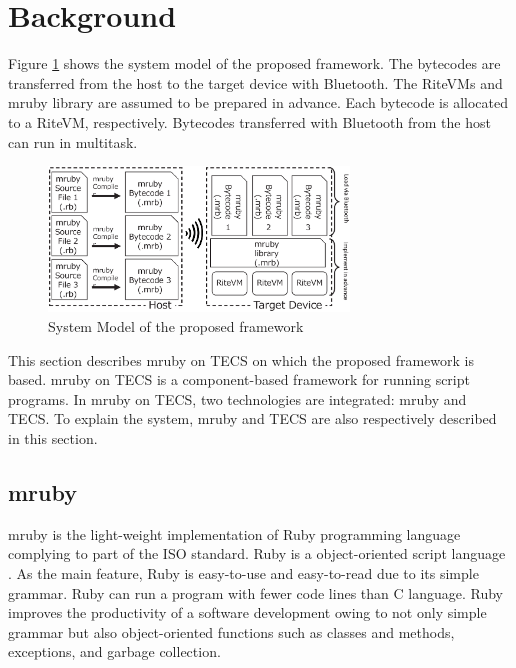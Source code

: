 \documentclass{sig-alternate-05-2015}
\begin{document}
\section{Background}
\label{sec:Background}
Figure \ref{fig:proposed} shows the system model of the proposed framework.
The bytecodes are transferred from the host to the target device with Bluetooth.
The RiteVMs and mruby library are assumed to be prepared in advance.
Each bytecode is allocated to a RiteVM, respectively.
Bytecodes transferred with Bluetooth from the host can run in multitask.

\begin{figure}[t]
    \centering
    \includegraphics[width=8cm,clip]{figure/proposed.eps}
    \vspace{1mm}
    \caption{System Model of the proposed framework}
    \vspace{1mm}
    \label{fig:proposed}
\end{figure}

This section describes mruby on TECS on which the proposed framework is based.
mruby on TECS is a component-based framework for running script programs.
In mruby on TECS, two technologies are integrated: mruby and TECS.
To explain the system, mruby and TECS are also respectively described in this section.

\subsection{mruby}
\label{sec:mruby}
mruby is the light-weight implementation of Ruby programming language complying to part of the ISO standard.
Ruby is a object-oriented script language \cite{url:Ruby}.
As the main feature, Ruby is easy-to-use and easy-to-read due to its simple grammar.
Ruby can run a program with fewer code lines than C language.
Ruby improves the productivity of a software development owing to not only simple grammar but also object-oriented functions such as classes and methods, exceptions, and garbage collection.
\end{document}
